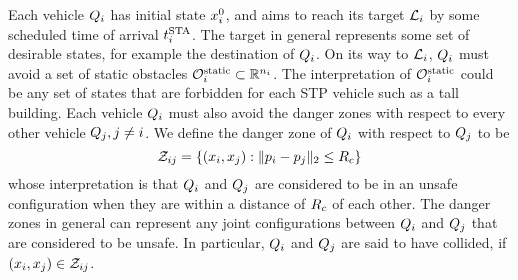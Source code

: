 

Each vehicle $Q_i$ has initial state $x^0_i$, and aims to reach its target $\mathcal{L}_i$ by some scheduled time of arrival $t^\text{STA}_i$. The target in general represents some set of desirable states, for example the destination of $Q_i$. %
On its way to $\mathcal{L}_i$, $Q_i$ must avoid a set of static obstacles $\mathcal{O}^\text{static}_i \subset \mathbb{R}^{n_i}$. The interpretation of $\mathcal{O}^\text{static}_i$ could be any set of states that are forbidden for each STP vehicle such as a tall building. Each vehicle $Q_i$ must also avoid the danger zones with respect to every other vehicle $Q_j, j\neq i$. We define the danger zone of $Q_i$ with respect to $Q_j$ to be
\begin{equation} \label{eqn:danger_zone_defn}
\dz_{ij} = \{(\state_i, \state_j): \|\pos_i - \pos_j\|_2 \le \rc\}
\end{equation}
\noindent whose interpretation is that $Q_i$ and $Q_j$ are considered to be in an unsafe configuration when they are within a distance of $R_c$ of each other. The danger zones in general can represent any joint configurations between $Q_i$ and $Q_j$ that are considered to be unsafe. In particular, $Q_i$ and $Q_j$ are said to have collided, if $(x_i, x_j) \in \mathcal{Z}_{ij}$.

